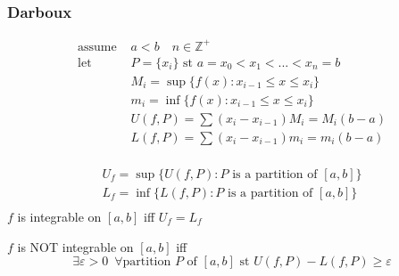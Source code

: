		\subsubsection{Darboux}
			\begin{definition}
				\begin{align*}
					\text{assume }&a<b\quad n\in\mathbb{Z}^+\\
					\text{let }&P=\{x_i\}\text{ st }a=x_0<x_1<...<x_n=b\\
				    &M_i = \sup\{f(x):x_{i-1}\le x\le x_i\}\\
					&m_i = \inf\{f(x):x_{i-1}\le x\le x_i\}\\
					&U(f,P)=\sum(x_i-x_{i-1})M_i=M_i(b-a)\\
					&L(f,P)=\sum(x_i-x_{i-1})m_i=m_i(b-a)\\
				\end{align*}
			\end{definition}
			\begin{definition}
				\begin{align*}
					U_f=\sup\{U(f,P):P\text{ is a partition of }[a,b]\}\\
					L_f=\inf\{L(f,P):P\text{ is a partition of }[a,b]\}\\
				\end{align*}
				$f$ is integrable on $[a,b]$ iff $U_f=L_f$
			\end{definition}
			\begin{definition}
				$f$ is NOT integrable on $[a,b]$ iff 
				$$\exists\varepsilon>0\enspace\forall\text{partition }P\text{ of }[a,b]\text{ st } U(f,P)-L(f,P)\ge\varepsilon$$
			\end{definition}
